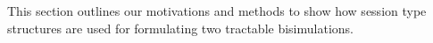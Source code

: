 \begin{comment}
A well-known feature in process calculi is \emph{polyadicity}, i.e.,  
passing around tuples of values in communications. 
We consider the polyadic extension of \HOp, denoted \pHOp.
In \pHOp we have polyadicity in session communications and abstractions; 
polyadicity of shared names is ruled out by typing. 
This is enough for most purposes, including our encoding from \HOp into \HO.
In a session-typed setting, encoding polyadicity is straightforward, thanks to 
the private character of 
(linear) session names --- see \S\,\ref{subsec:pho} for details.

\smallskip

\myparagraph{A Non Encodability Result.}
We also show that shared names strictly add expressiveness to session calculi: that is,
there are (non deterministic) behaviors expressible with shared names not expressible using linear names only.
Although somewhat expected we do not know of a formal proof.
We propose such a formal proof, which relies crucially on the behavioral theory that we have introduced here
and on its determinacy properties. %


\subsection{Tractable Bisimilarities for Session-Typed Processes}
\end{comment}

\label{subsec:intro:bisimulation}
\noi 
This section outlines our motivations and methods 
to show how session type structures are used for formulating 
two tractable bisimulations. 

